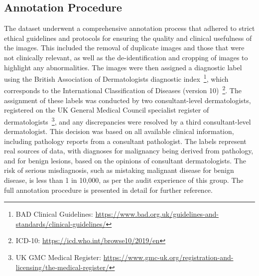 \subsection{Annotation Procedure}
\label{subsec:annotation_procedure}
The dataset underwent a comprehensive annotation process that adhered to strict ethical guidelines and protocols for ensuring the quality and clinical usefulness of the images. This included the removal of duplicate images and those that were not clinically relevant, as well as the de-identification and cropping of images to highlight any abnormalities. The images were then assigned a diagnostic label using the British Association of Dermatologists diagnostic index~\footnote{BAD Clinical Guidelines: \url{https://www.bad.org.uk/guidelines-and-standards/clinical-guidelines/}}, which corresponds to the International Classification of Diseases (version 10)~\footnote{ICD-10: \url{https://icd.who.int/browse10/2019/en}}. The assignment of these labels was conducted by two consultant-level dermatologists, registered on the UK General Medical Council specialist register of dermatologists~\footnote{UK GMC Medical Register: \url{https://www.gmc-uk.org/registration-and-licensing/the-medical-register/}}, and any discrepancies were resolved by a third consultant-level dermatologist. This decision was based on all available clinical information, including pathology reports from a consultant pathologist. The labels represent real sources of data, with diagnoses for malignancy being derived from pathology, and for benign lesions, based on the opinions of consultant dermatologists. The risk of serious misdiagnosis, such as mistaking malignant disease for benign disease, is less than 1 in 10,000, as per the audit experience of this group. The full annotation procedure is presented in detail for further reference.

